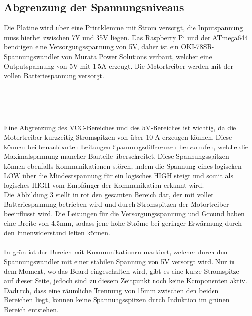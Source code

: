 \documentclass[12pt]{article}
\begin{document}
\subsection{Abgrenzung der Spannungsniveaus}
Die Platine wird über eine Printklemme mit Strom versorgt, die Inputspannung muss hierbei zwischen 7V und 35V liegen. Das Raspberry Pi und der ATmega644 benötigen eine Versorgungsspannung von 5V, daher ist ein OKI-78SR-Spannungswandler von Murata Power Solutions verbaut, welcher eine Outputspannung von 5V mit 1.5A erzeugt. Die Motortreiber werden mit der vollen Batteriespannung versorgt.
\begin{figure}
\\
\\
\\
\end{figure}
Eine Abgrenzung des VCC-Bereiches und des 5V-Bereiches ist wichtig, da die Motortreiber kurzzeitig Stromspitzen von über 10 A erzeugen können. Diese können bei benachbarten Leitungen Spannungsdifferenzen hervorrufen, welche die Maximalspannung mancher Bauteile überschreitet. Diese Spannungsspitzen können ebenfalls Kommunikationen stören, indem die Spannung eines logischen LOW über die Mindestspannung für ein logisches HIGH steigt und somit als logisches HIGH vom Empfänger der Kommunikation erkannt wird.\\
Die Abbildung 3 stellt in rot den gesamten Bereich dar, der mit voller Batteriespannung betrieben wird und durch Stromspitzen der Motortreiber beeinflusst wird. Die Leitungen für die Versorgungsspannung und Ground haben eine Breite von 4.5mm, sodass jene hohe Ströme bei geringer Erwärmung durch den Innenwiderstand leiten können.
\\\\In grün ist der Bereich mit Kommunikationen markiert, welcher durch den Spannungswandler mit einer stabilen Spannung von 5V versorgt wird. Nur in dem Moment, wo das Board eingeschalten wird, gibt es eine kurze Stromspitze auf dieser Seite, jedoch sind zu diesem Zeitpunkt noch keine Komponenten aktiv. Dadurch, dass eine räumliche Trennung von 15mm zwischen den beiden Bereichen liegt, können keine 
Spannungsspitzen durch Induktion im grünen Bereich entstehen.
\end{document}
